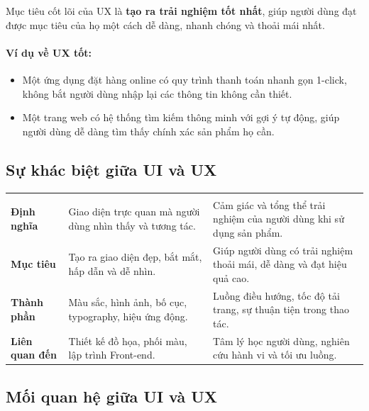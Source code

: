\begin{tipBox}
Mục tiêu cốt lõi của UX là \textbf{tạo ra trải nghiệm tốt nhất}, giúp người dùng đạt được mục tiêu của họ một cách dễ dàng, nhanh chóng và thoải mái nhất.
\end{tipBox}

\paragraph{Ví dụ về UX tốt:}
\begin{itemize}[leftmargin=1.8em, itemsep=2pt, parsep=0pt]
    \item Một ứng dụng đặt hàng online có quy trình thanh toán nhanh gọn 1-click, không bắt người dùng nhập lại các thông tin không cần thiết.
    \item Một trang web có hệ thống tìm kiếm thông minh với gợi ý tự động, giúp người dùng dễ dàng tìm thấy chính xác sản phẩm họ cần.
\end{itemize}

\subsection{Sự khác biệt giữa UI và UX}

\begin{prettyTableBox}
\begin{tabularx}{\linewidth}{>{\bfseries\color{primaryBlue}}C{2.6cm} Z Z}
 &  &  \\
Định nghĩa & Giao diện trực quan mà người dùng nhìn thấy và tương tác. & Cảm giác và tổng thể trải nghiệm của người dùng khi sử dụng sản phẩm. \\
Mục tiêu & Tạo ra giao diện đẹp, bắt mắt, hấp dẫn và dễ nhìn. & Giúp người dùng có trải nghiệm thoải mái, dễ dàng và đạt hiệu quả cao. \\
Thành phần & Màu sắc, hình ảnh, bố cục, typography, hiệu ứng động. & Luồng điều hướng, tốc độ tải trang, sự thuận tiện trong thao tác. \\
Liên quan đến & Thiết kế đồ họa, phối màu, lập trình Front-end. & Tâm lý học người dùng, nghiên cứu hành vi và tối ưu luồng. \\
\end{tabularx}
\end{prettyTableBox}

\subsection{Mối quan hệ giữa UI và UX}

